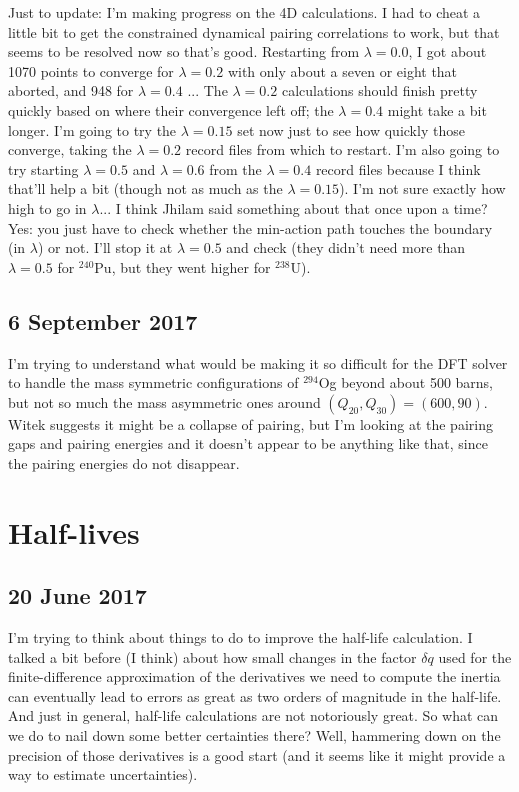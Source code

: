 \documentclass[]{report}
\begin{document}
Just to update: I'm making progress on the 4D calculations. I had to cheat a little bit to get the constrained dynamical pairing correlations to work, but that seems to be resolved now so that's good. Restarting from $\lambda=0.0$, I got about 1070 points to converge for $\lambda=0.2$ with only about a seven or eight that aborted, and 948 for $\lambda=0.4$ ... The $\lambda=0.2$ calculations should finish pretty quickly based on where their convergence left off; the $\lambda=0.4$ might take a bit longer. I'm going to try the $\lambda=0.15$ set now just to see how quickly those converge, taking the $\lambda=0.2$ record files from which to restart. I'm also going to try starting $\lambda=0.5$ and $\lambda=0.6$ from the $\lambda=0.4$ record files because I think that'll help a bit (though not as much as the $\lambda=0.15$). I'm not sure exactly how high to go in $\lambda$... I think Jhilam said something about that once upon a time? Yes: you just have to check whether the min-action path touches the boundary (in $\lambda$) or not. I'll stop it at $\lambda=0.5$ and check (they didn't need more than $\lambda=0.5$ for $^{240}$Pu, but they went higher for $^{238}$U).

\subsection*{6 September 2017}
I'm trying to understand what would be making it so difficult for the DFT solver to handle the mass symmetric configurations of $^{294}$Og beyond about 500 barns, but not so much the mass asymmetric ones around $(Q_{20},Q_{30})=(600, 90)$. Witek suggests it might be a collapse of pairing, but I'm looking at the pairing gaps and pairing energies and it doesn't appear to be anything like that, since the pairing energies do not disappear. 

\section*{Half-lives}
\subsection*{20 June 2017}
I'm trying to think about things to do to improve the half-life calculation. I talked a bit before (I think) about how small changes in the factor $\delta q$ used for the finite-difference approximation of the derivatives we need to compute the inertia can eventually lead to errors as great as two orders of magnitude in the half-life. And just in general, half-life calculations are not notoriously great. So what can we do to nail down some better certainties there? Well, hammering down on the precision of those derivatives is a good start (and it seems like it might provide a way to estimate uncertainties).
\end{document}
